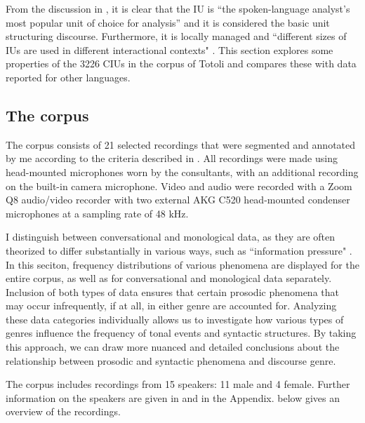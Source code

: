 From the discussion in , it is clear that the IU is  “the spoken-language analyst’s most popular unit of choice for analysis”  \citep[841]{Croft_1995} and it is considered the basic unit structuring discourse.  Furthermore, it is locally managed and ``different sizes  of IUs are used in different interactional contexts" \citep[674]{Park_2002}. This section explores some properties of the 3226 CIUs in the corpus of Totoli  and compares these with data reported for other languages. 



\subsection{The corpus}
\label{Corpus}


The corpus consists of 21 selected recordings that were segmented and  annotated by me according to the criteria described in . All recordings were  made using head-mounted microphones worn by the consultants, with an additional recording on the built-in camera microphone. Video and audio were recorded with a Zoom Q8 audio/video recorder with two external AKG C520 head-mounted condenser microphones at a sampling rate of 48 kHz.



I distinguish between conversational and monological data, as they are often theorized to differ substantially in various ways, such as ``information pressure" \citep[836]{du1987discourse}.
In this seciton, frequency distributions of various phenomena are displayed for the entire corpus, as well as for conversational and monological data separately. Inclusion of both types of data  ensures that certain prosodic phenomena that may occur infrequently, if at all, in either genre are accounted for. Analyzing these data categories individually allows us to investigate how various types of genres influence the frequency of tonal events and syntactic structures. By taking this approach, we can draw more nuanced and detailed conclusions about the relationship between prosodic and syntactic phenomena and discourse genre.



The corpus includes recordings from 15 speakers: 11 male and 4 female. Further information on the speakers are given in   and 	 in the Appendix.   below gives an overview of the recordings.

